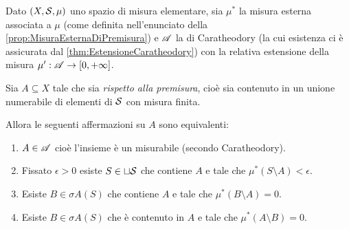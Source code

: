 \begin{theorem}\label{thm:EquivalenzeMisurabilitaSottoinsieme}
	Dato $(X,\S,\mu)$ uno spazio di misura elementare, sia $\mu^*$ la misura esterna associata a $\mu$ (come definita nell'enunciato della \cref{prop:MisuraEsternaDiPremisura}) e $\A$ la \sigalg{} di Caratheodory (la cui esistenza ci è assicurata dal \cref{thm:EstensioneCaratheodory}) con la relativa estensione della misura $\mu':\A\to\Rpiu$.
	
	Sia $A\subseteq X$ tale che sia \emph{\sigfin[o] rispetto alla premisura}, cioè sia contenuto in un unione numerabile di elementi di $\S$ con misura finita.
	
	Allora le seguenti affermazioni su $A$ sono equivalenti:
	\begin{enumerate}[label=(\arabic*),ref=(\arabic*)]
		\item $A\in\A$ cioè l'insieme è un misurabile (secondo Caratheodory).\label{it:MisurabileEquivalenze}
		\item Fissato $\epsilon>0$ esiste $S\in\sqcup\S$ che contiene $A$ e tale che $\mu^*(S\setminus A)<\epsilon$.\label{it:UnioniDaFuoriEquivalenze}
		\item Esiste $B\in\sigma A(S)$ che contiene $A$ e tale che $\mu^*(B\setminus A)=0$.\label{it:SigmaDaFuoriEquivalenze}
		\item Esiste $B\in\sigma A(S)$ che è contenuto in $A$ e tale che $\mu^*(A\setminus B)=0$.\label{it:SigmaDaDentroEquivalenze}
	\end{enumerate}
\end{theorem}
\newcommand{\ImplicationProof}[2]{$\text{\ref{#1}}\implies\text{\ref{#2}}$}%
